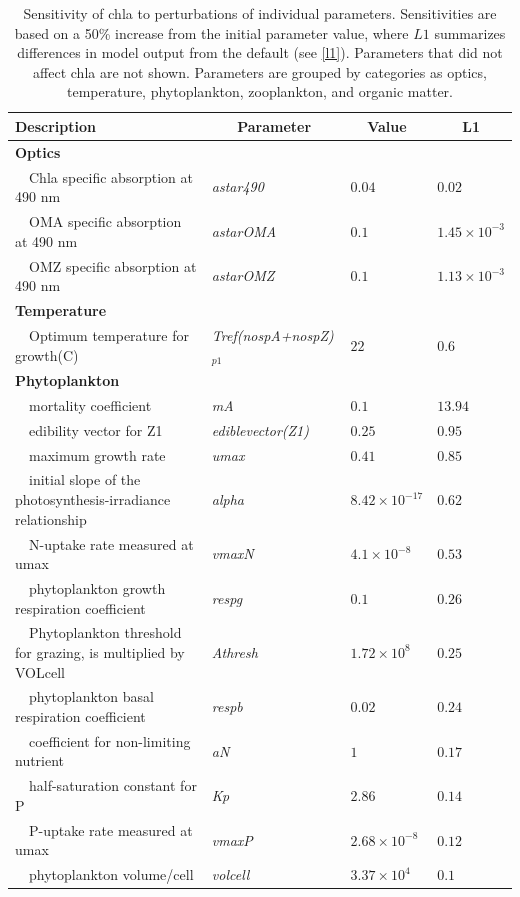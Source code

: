 \documentclass[review]{elsarticle}\usepackage[]{graphicx}\usepackage[]{color}
\begin{document}
\begin{table}[!tbp]
{\footnotesize
\caption{Sensitivity of \ac{chla} to perturbations of individual parameters.  Sensitivities are based on a 50\% increase from the initial parameter value, where $L1$ summarizes differences in model output from the default (see \cref{l1}).  Parameters that did not affect \ac{chla} are not shown.  Parameters are grouped by categories as optics, temperature, phytoplankton, zooplankton, and organic matter.\label{tab:chlsens}} 
\begin{center}
\begin{tabular}{llll}
\hline\hline
\multicolumn{1}{l}{Description}&\multicolumn{1}{c}{Parameter}&\multicolumn{1}{c}{Value}&\multicolumn{1}{c}{L1}\tabularnewline
\hline
{\bfseries Optics}&&&\tabularnewline
~~Chla specific absorption at 490 nm&\textit{astar490}&$0.04$&$0.02$\tabularnewline
~~OMA specific absorption at 490 nm&\textit{astarOMA}&$0.1$&$1.45\times 10^{-3}$\tabularnewline
~~OMZ specific absorption at 490 nm&\textit{astarOMZ}&$0.1$&$1.13\times 10^{-3}$\tabularnewline
\hline
{\bfseries Temperature}&&&\tabularnewline
~~Optimum temperature for growth(C)&\textit{Tref(nospA+nospZ)$_{p1}$}&$22$&$0.6$\tabularnewline
\hline
{\bfseries Phytoplankton}&&&\tabularnewline
~~mortality coefficient&\textit{mA}&$0.1$&$13.94$\tabularnewline
~~edibility vector for Z1&\textit{ediblevector(Z1)}&$0.25$&$0.95$\tabularnewline
~~maximum growth rate&\textit{umax}&$0.41$&$0.85$\tabularnewline
~~initial slope of the photosynthesis-irradiance relationship&\textit{alpha}&$8.42\times 10^{-17}$&$0.62$\tabularnewline
~~N-uptake rate measured at umax&\textit{vmaxN}&$4.1\times 10^{-8}$&$0.53$\tabularnewline
~~phytoplankton growth respiration coefficient&\textit{respg}&$0.1$&$0.26$\tabularnewline
~~Phytoplankton threshold for grazing, is multiplied by VOLcell&\textit{Athresh}&$1.72\times 10^{8}$&$0.25$\tabularnewline
~~phytoplankton basal respiration coefficient&\textit{respb}&$0.02$&$0.24$\tabularnewline
~~coefficient for non-limiting nutrient&\textit{aN}&$1$&$0.17$\tabularnewline
~~half-saturation constant for P&\textit{Kp}&$2.86$&$0.14$\tabularnewline
~~P-uptake rate measured at umax&\textit{vmaxP}&$2.68\times 10^{-8}$&$0.12$\tabularnewline
~~phytoplankton volume/cell&\textit{volcell}&$3.37\times 10^{4}$&$0.1$\tabularnewline

\end{tabular}
\end{center}}
\end{table}
\end{document}
